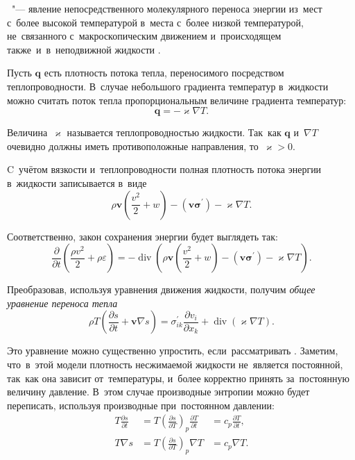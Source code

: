 ~"--- явление непосредственного молекулярного переноса энергии из~мест с~более высокой температурой в~места с~более низкой температурой, не~связанного с~макроскопическим движением и~происходящем также~и~в~неподвижной жидкости \cite[с.~269]{landauVI}.

Пусть $\mathbf{q}$ есть плотность потока тепла, переносимого посредством теплопроводности.
В~случае небольшого градиента температур в~жидкости можно считать поток тепла пропорциональным величине градиента температур:
$$\mathbf{q} = - \varkappa\nabla{T}.$$

Величина~$\varkappa$ называется теплопроводностью жидкости.
Так~как $\mathbf{q}$ и~$\nabla{T}$ очевидно должны иметь противоположные направления, то~$\varkappa > 0$.

C~учётом вязкости и~теплопроводности полная плотность потока энергии в~жидкости записывается в~виде
$$\rho\mathbf{v}\left(\frac{v^2}{2} + w\right)
- \left(\mathbf{v}\boldsymbol{\sigma^\prime}\right)
- \varkappa\nabla{T}.$$

Соответственно, закон сохранения энергии будет выглядеть так:
$$
\frac{\partial}{\partial{t}}\left(\frac{\rho{}v^2}{2} + \rho\varepsilon\right) =
- \operatorname{div}{\left(\rho\mathbf{v}\left(\frac{v^2}{2} + w\right)
- \left(\mathbf{v}\boldsymbol{\sigma^\prime}\right)
- \varkappa\nabla{T}\right)}.$$

Преобразовав, используя уравнения движения жидкости, получим \emph{общее уравнение переноса тепла} 
$$\rho{}T\left(\frac{\partial{s}}{\partial{t}} + \mathbf{v}\nabla{s}\right) =
\sigma^{\prime}_{ik}\frac{\partial{v_i}}{\partial{x_k}} + \operatorname{div}{\left(\varkappa\nabla{T}\right)}.
$$

Это уравнение можно существенно упростить, если~рассматривать .
Заметим, что~в~этой модели плотность несжимаемой жидкости не~является постоянной, так~как она зависит от~температуры, и~более корректно принять за~постоянную величину давление.
В~этом случае производные энтропии можно будет переписать, используя производные при~постоянном давлении:
$$\begin{aligned}
    T\frac{\partial{s}}{\partial{t}} &=
	T\left(\frac{\partial{s}}{\partial{T}}\right)_p\frac{\partial{T}}{\partial{t}} &=
	c_p\frac{\partial{T}}{\partial{t}}, \\
    T\nabla{s} &=
    T\left(\frac{\partial{s}}{\partial{T}}\right)_p\nabla{T} &=
    c_p\nabla{T}. \\
\end{aligned}$$

